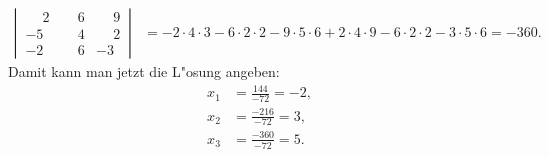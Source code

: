 \begin{loesung}
\begin{align*}
\left|\,\begin{matrix}
\phantom{-}2&\phantom{-}6&\phantom{-}9\\
         - 5&\phantom{-}4&\phantom{-}2\\
         - 2&\phantom{-}6&         - 3
\end{matrix}\,\right|
&=
-2\cdot4\cdot 3-6\cdot2\cdot 2-9\cdot5\cdot 6+2\cdot4\cdot 9-6\cdot 2\cdot 2-3\cdot 5\cdot 6
=-360.
\end{align*}
Damit kann man jetzt die L"osung angeben:
\begin{align*}
x_1&=\frac{144}{-72}=-2,\\
x_2&=\frac{-216}{-72}=3,\\
x_3&=\frac{-360}{-72}=5.
\end{align*}
\end{loesung}
